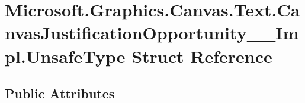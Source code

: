 \hypertarget{struct_microsoft_1_1_graphics_1_1_canvas_1_1_text_1_1_canvas_justification_opportunity_____impl_1_1_unsafe_type}{}\section{Microsoft.\+Graphics.\+Canvas.\+Text.\+Canvas\+Justification\+Opportunity\+\_\+\+\_\+\+Impl.\+Unsafe\+Type Struct Reference}
\label{struct_microsoft_1_1_graphics_1_1_canvas_1_1_text_1_1_canvas_justification_opportunity_____impl_1_1_unsafe_type}
\subsection*{Public Attributes}
